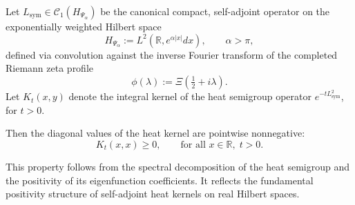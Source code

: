 \begin{lemma}
\label{lem:heat_kernel_diagonal_positivity}
Let \( L_{\mathrm{sym}} \in \mathcal{C}_1(H_{\Psi_\alpha}) \) be the canonical compact, self-adjoint operator on the exponentially weighted Hilbert space
\[
H_{\Psi_\alpha} := L^2(\mathbb{R}, e^{\alpha |x|} dx), \qquad \alpha > \pi,
\]
defined via convolution against the inverse Fourier transform of the completed Riemann zeta profile
\[
\phi(\lambda) := \Xi\left(\tfrac{1}{2} + i\lambda\right).
\]
Let \( K_t(x, y) \) denote the integral kernel of the heat semigroup operator \( e^{-t L_{\mathrm{sym}}^2} \), for \( t > 0 \).

\medskip
\noindent
Then the diagonal values of the heat kernel are pointwise nonnegative:
\[
K_t(x,x) \geq 0, \qquad \text{for all } x \in \mathbb{R}, \; t > 0.
\]

\medskip
\noindent
This property follows from the spectral decomposition of the heat semigroup and the positivity of its eigenfunction coefficients. It reflects the fundamental positivity structure of self-adjoint heat kernels on real Hilbert spaces.
\end{lemma}
